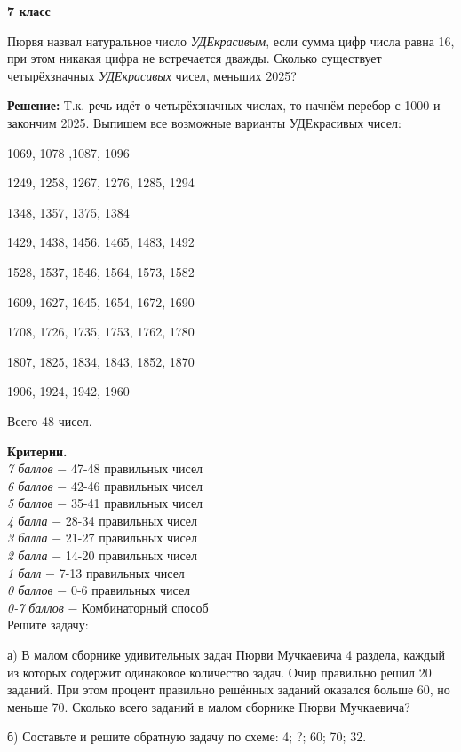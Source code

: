 \centerline{\bf \Large  7 класс}

 Пюрвя назвал натуральное число \textit{УДЕкрасивым}, если сумма цифр числа равна 16, при этом никакая цифра не встречается дважды. Сколько существует четырёхзначных \textit{УДЕкрасивых} чисел, меньших 2025?

\textbf{Решение:} Т.к. речь идёт о четырёхзначных числах, то начнём перебор с 1000 и закончим 2025.
Выпишем все возможные варианты УДЕкрасивых чисел:

1069, 1078 ,1087, 1096

1249, 1258, 1267, 1276, 1285, 1294

1348, 1357, 1375, 1384

1429, 1438, 1456, 1465, 1483, 1492

1528, 1537, 1546, 1564, 1573, 1582

1609, 1627, 1645, 1654, 1672, 1690

1708, 1726, 1735, 1753, 1762, 1780

1807, 1825, 1834, 1843, 1852, 1870

1906, 1924, 1942, 1960

Всего 48 чисел.

\textbf{Критерии.} \\
\textit{7 баллов} $-$ 47-48 правильных чисел\\
\textit{6 баллов} $-$ 42-46 правильных чисел\\
\textit{5 баллов} $-$ 35-41 правильных чисел\\
\textit{4 балла} $-$ 28-34 правильных чисел\\
\textit{3 балла} $-$ 21-27 правильных чисел\\
\textit{2 балла} $-$ 14-20 правильных чисел\\
\textit{1 балл} $-$ 7-13 правильных чисел\\
\textit{0 баллов} $-$ 0-6 правильных чисел\\
\textit{0-7 баллов} $-$ Комбинаторный способ\\

 Решите задачу:

а) В малом сборнике удивительных задач Пюрви Мучкаевича 4 раздела, каждый из которых содержит одинаковое количество задач. Очир правильно решил 20 заданий. При этом процент правильно решённых заданий оказался больше 60, но меньше 70. Сколько всего заданий в малом сборнике Пюрви Мучкаевича?

б) Составьте и решите обратную задачу по схеме: 4; ?; 60; 70; 32.

